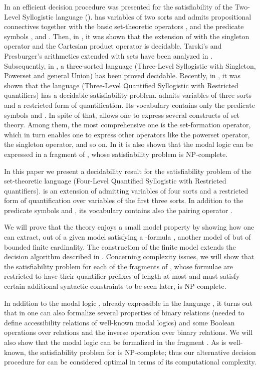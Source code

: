 \documentclass{fundam}
\begin{document}
In \cite{FerOm1978} an efficient decision procedure was presented for
the satisfiability of the Two-Level Syllogistic language ().
 has variables of two sorts and admits propositional connectives
together with the basic set-theoretic operators , and the predicate symbols , and .  Then,
in \cite{CanCut90}, it was shown that the extension of  with the
singleton operator and the Cartesian product operator is decidable.
Tarski's and Presburger's arithmetics extended with sets have been
analyzed in \cite{CCS90}.  Subsequently, in \cite{CanCut93}, a
three-sorted language  (Three-Level Syllogistic with
Singleton, Powerset and general Union) has been proved decidable.
Recently, in \cite{CanNic08}, it was shown that the language 
(Three-Level Quantified Syllogistic with Restricted quantifiers) has a
decidable satisfiability problem.   admits variables of three
sorts and a restricted form of quantification.  Its vocabulary
contains only the predicate symbols  and .  In spite of that,
 allows one to express several constructs of set theory.
Among them, the most comprehensive one is the set-formation operator, which in
turn enables one to express other operators like the powerset
operator, the singleton operator, and so on.  In \cite{CanNic08} it is
also shown that the modal logic  can be expressed in a
fragment of , whose satisfiability problem is
\textsf{NP}-complete.

In this paper we present a decidability result for the satisfiability
problem of the set-theoretic language  (Four-Level Quantified
Syllogistic with Restricted quantifiers).   is an extension of
 admitting variables of four sorts and a restricted form of
quantification over variables of the first three sorts.  In addition
to the predicate symbols  and , its vocabulary contains also the
pairing operator .

We will prove that the theory  enjoys a small model property
by showing how one can extract, out of a given model satisfying a
-formula , another model of  but of bounded finite
cardinality.  The construction of the finite model extends the
decision algorithm described in \cite{CanNic08}.  Concerning complexity
issues, we will show that the satisfiability problem for each of the
fragments  of , whose formulae are restricted to
have their quantifier prefixes of length at most  and must
satisfy certain additional syntactic constraints to be seen later, is
\textsf{NP}-complete.

In addition to the modal logic , already expressible in the
language , it turns out that in  one can also
formalize several properties of binary relations (needed to define
accessibility relations of well-known modal logics) and some Boolean
operations over relations and the inverse operation over binary
relations.  We will also show that the modal logic  can be
formalized in the fragment .  As is well-known, the
satisfiability problem for  is \textsf{NP}-complete; thus our
alternative decision procedure for  can be considered optimal in
terms of its computational complexity.
\end{document}
